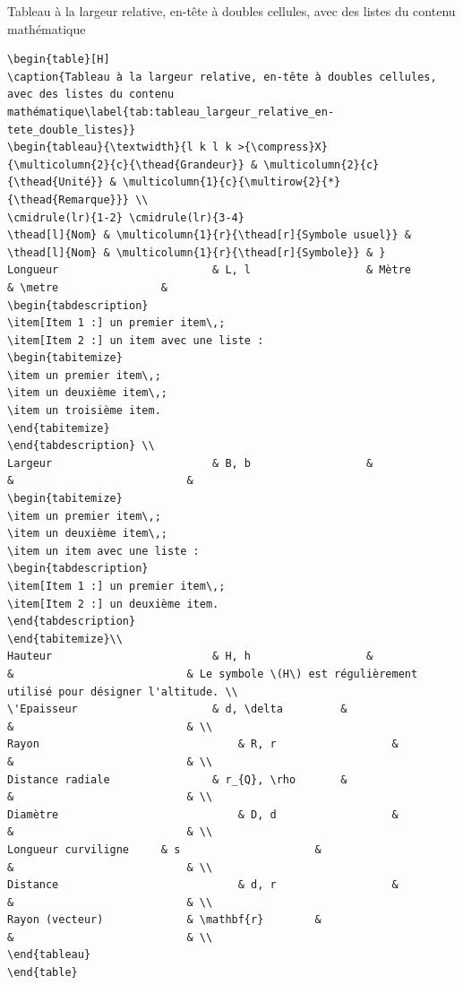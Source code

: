 \documentclass[a4paper, 11pt, twoside, fleqn]{memoir}
\begin{document}
\begin{exemple}{Tableau à la largeur relative, en-tête à doubles cellules, avec des listes du contenu mathématique}{}
\begin{verbatim}
\begin{table}[H]
\caption{Tableau à la largeur relative, en-tête à doubles cellules, avec des listes du contenu mathématique\label{tab:tableau_largeur_relative_en-tete_double_listes}}
\begin{tableau}{\textwidth}{l k l k >{\compress}X}
{\multicolumn{2}{c}{\thead{Grandeur}} & \multicolumn{2}{c}{\thead{Unité}} & \multicolumn{1}{c}{\multirow{2}{*}{\thead{Remarque}}} \\
\cmidrule(lr){1-2} \cmidrule(lr){3-4}
\thead[l]{Nom} & \multicolumn{1}{r}{\thead[r]{Symbole usuel}} & \thead[l]{Nom} & \multicolumn{1}{r}{\thead[r]{Symbole}} & }
Longueur 						& L, l					& Mètre			& \metre				& 
\begin{tabdescription}
\item[Item 1 :] un premier item\,;
\item[Item 2 :] un item avec une liste :
\begin{tabitemize}
\item un premier item\,;
\item un deuxième item\,;
\item un troisième item.
\end{tabitemize}
\end{tabdescription} \\
Largeur							& B, b					& 						&							& 
\begin{tabitemize}
\item un premier item\,;
\item un deuxième item\,;
\item un item avec une liste :
\begin{tabdescription}
\item[Item 1 :] un premier item\,;
\item[Item 2 :] un deuxième item.
\end{tabdescription}
\end{tabitemize}\\
Hauteur							& H, h					&						&							& Le symbole \(H\) est régulièrement utilisé pour désigner l'altitude. \\
\'Epaisseur						& d, \delta			& 						&							& \\
Rayon								& R, r					&						&							& \\
Distance radiale				& r_{Q}, \rho		&						&							& \\
Diamètre							& D, d					&						&							& \\
Longueur curviligne		& s						&						&							& \\
Distance							& d, r					& 						&							& \\
Rayon (vecteur)				& \mathbf{r}		&						&							& \\
\end{tableau}
\end{table}
\end{verbatim}


\end{exemple}
\end{document}
